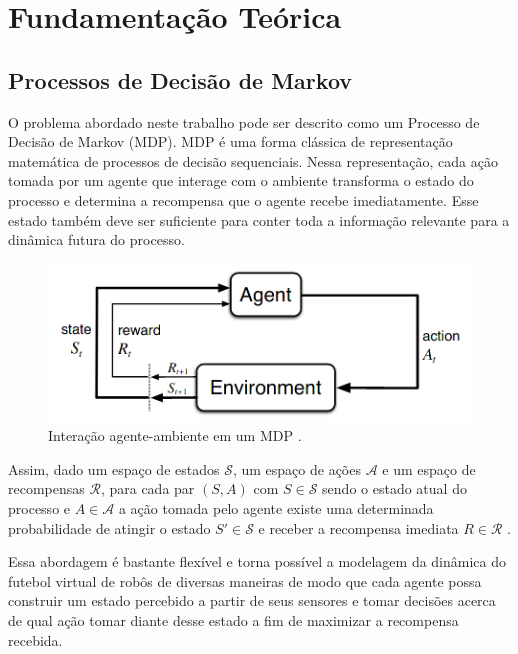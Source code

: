 \chapter{Fundamentação Teórica \label{chap:FundamentacaoMatematica}}



\section{Processos de Decisão de Markov}

O problema abordado neste trabalho pode ser descrito como um Processo de Decisão de Markov (MDP).
MDP é uma forma clássica de representação matemática de processos de decisão sequenciais.
Nessa representação, cada ação tomada por um agente que interage com o ambiente transforma o estado do processo e determina a recompensa que o agente recebe imediatamente.
Esse estado também deve ser suficiente para conter toda a informação relevante para a dinâmica futura do processo.

\begin{figure}[h]
	\includegraphics[width=0.6\linewidth]{figs/RL.png}
	\centering
	\caption{Interação agente-ambiente em um MDP \cite{sutton2018reinforcement}.} %
	\label{fig:mdp_env}
\end{figure}

Assim, dado um espaço de estados $\mathcal{S}$, um espaço de ações $\mathcal{A}$ e um espaço de recompensas $\mathcal{R}$, para cada par $(S, A)$ com $S \in \mathcal{S}$ sendo o estado atual do processo e $A \in \mathcal{A}$ a ação tomada pelo agente existe uma determinada probabilidade de atingir o estado $S' \in \mathcal{S}$ e receber a recompensa imediata $R \in \mathcal{R}$ \cite{sutton2018reinforcement}.

Essa abordagem é bastante flexível e torna possível a modelagem da dinâmica do futebol virtual de robôs de diversas maneiras de modo que cada agente possa construir um estado percebido a partir de seus sensores e tomar decisões acerca de qual ação tomar diante desse estado a fim de maximizar a recompensa recebida.

